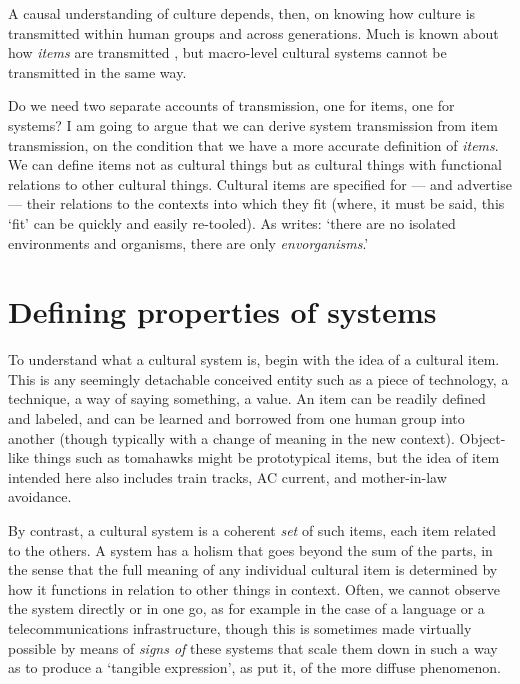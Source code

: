 A causal understanding of culture depends, then, on knowing how culture is transmitted within human groups and across 
generations. Much is known about how \textit{items} are transmitted 
\citep{rogers_diffusion_2003}, but macro-level cultural systems cannot be 
transmitted in the same way. 



Do we need two separate accounts of transmission, one for items, one for 
systems? I am going to argue that we can derive system transmission from 
item transmission, on the condition that we have a more accurate 
definition of \textit{items}. We can define items not as cultural things but as 
cultural things with functional relations to other cultural things. 
Cultural items are specified for --- and advertise --- their relations to the 
contexts into which they fit (where, it must be said, this \textquoteleft fit' can be 
quickly and easily re-tooled). As \citet[19]{kockelman_agent_2013} writes: \textquoteleft there 
are no isolated environments and organisms, there are only \textit{envorganisms}.' 

\section{Defining properties of systems}

To understand what a cultural system is, begin with the idea of a cultural item. This is any seemingly detachable conceived entity such 
as a piece of technology, a technique, a way of saying something, a 
value. An item can be readily defined and labeled, and can be learned 
and borrowed from one human group into another (though typically with 
a change of meaning in the new context). Object-like 
things such as tomahawks might be prototypical items, but the idea of 
item intended here also includes train tracks, AC current, and 
mother-in-law avoidance. 



By contrast, a cultural system is a coherent \textit{set} of such items, each 
item related to the others. A system has a holism that goes 
beyond the sum of the parts, in the sense that the full meaning of any 
individual cultural item is determined by how it functions in relation to other things in context. Often, we cannot observe the system directly or in one go, as for 
example in the case of a language or a telecommunications 
infrastructure, though this is sometimes made virtually possible by 
means of \textit{signs of} these systems that scale them down in such 
a way as to produce a \textquoteleft tangible expression', as \citet[208]{durkheim_elementary_1912} put it, of the more diffuse phenomenon. 



